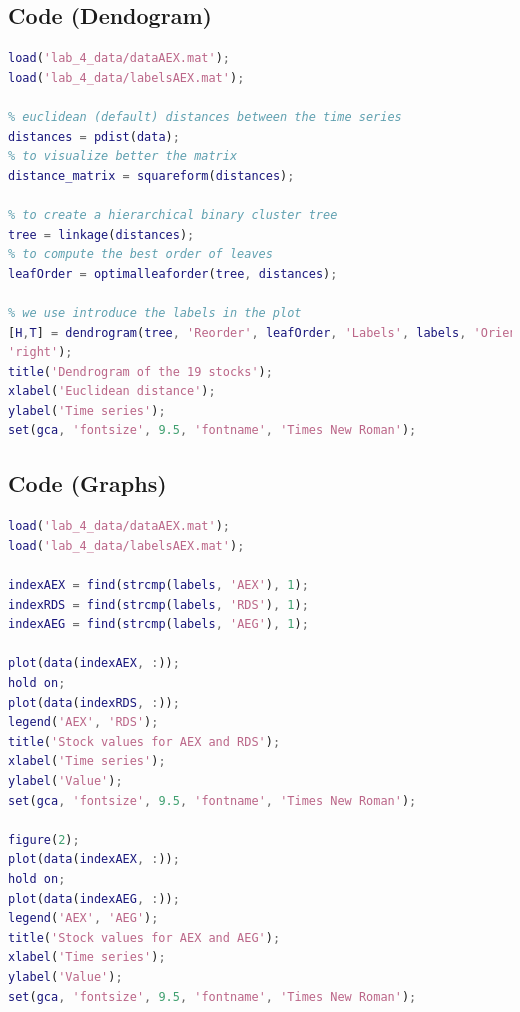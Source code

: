 \documentclass[a4paper]{article}
\begin{document}
\subsection{Code (Dendogram)}

\begin{lstlisting}[language=Matlab]
load('lab_4_data/dataAEX.mat');
load('lab_4_data/labelsAEX.mat');

% euclidean (default) distances between the time series
distances = pdist(data);
% to visualize better the matrix
distance_matrix = squareform(distances);

% to create a hierarchical binary cluster tree
tree = linkage(distances);
% to compute the best order of leaves
leafOrder = optimalleaforder(tree, distances);

% we use introduce the labels in the plot
[H,T] = dendrogram(tree, 'Reorder', leafOrder, 'Labels', labels, 'Orientation',
'right');
title('Dendrogram of the 19 stocks');
xlabel('Euclidean distance');
ylabel('Time series');
set(gca, 'fontsize', 9.5, 'fontname', 'Times New Roman');
\end{lstlisting}

\subsection{Code (Graphs)}

\begin{lstlisting}[language=Matlab]
load('lab_4_data/dataAEX.mat');
load('lab_4_data/labelsAEX.mat');

indexAEX = find(strcmp(labels, 'AEX'), 1);
indexRDS = find(strcmp(labels, 'RDS'), 1);
indexAEG = find(strcmp(labels, 'AEG'), 1);

plot(data(indexAEX, :));
hold on;
plot(data(indexRDS, :));
legend('AEX', 'RDS');
title('Stock values for AEX and RDS');
xlabel('Time series');
ylabel('Value');
set(gca, 'fontsize', 9.5, 'fontname', 'Times New Roman');

figure(2);
plot(data(indexAEX, :));
hold on;
plot(data(indexAEG, :));
legend('AEX', 'AEG');
title('Stock values for AEX and AEG');
xlabel('Time series');
ylabel('Value');
set(gca, 'fontsize', 9.5, 'fontname', 'Times New Roman');
\end{lstlisting}
\end{document}
